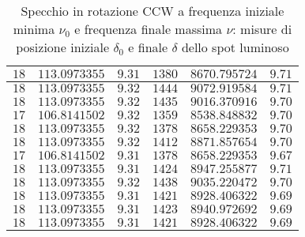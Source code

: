 \documentclass{article} %
\begin{document}
\begin{table}
\begin{tabular}{||c|c|c||c|c|c||}
            $18$ & $113.0973355$ & $9.31$ & $1380$ & $8670.795724$ & $9.71$ \\\hline
            $18$ & $113.0973355$ & $9.32$ & $1444$ & $9072.919584$ & $9.71$ \\\hline
            $18$ & $113.0973355$ & $9.32$ & $1435$ & $9016.370916$ & $9.70$ \\\hline
            $17$ & $106.8141502$ & $9.32$ & $1359$ & $8538.848832$ & $9.70$ \\\hline
            $18$ & $113.0973355$ & $9.32$ & $1378$ & $8658.229353$ & $9.70$ \\\hline
            $18$ & $113.0973355$ & $9.32$ & $1412$ & $8871.857654$ & $9.70$ \\\hline
            $17$ & $106.8141502$ & $9.31$ & $1378$ & $8658.229353$ & $9.67$ \\\hline
            $18$ & $113.0973355$ & $9.31$ & $1424$ & $8947.255877$ & $9.71$ \\\hline
            $18$ & $113.0973355$ & $9.32$ & $1438$ & $9035.220472$ & $9.70$ \\\hline
            $18$ & $113.0973355$ & $9.31$ & $1421$ & $8928.406322$ & $9.69$ \\\hline
            $18$ & $113.0973355$ & $9.31$ & $1423$ & $8940.972692$ & $9.69$ \\\hline
            $18$ & $113.0973355$ & $9.31$ & $1421$ & $8928.406322$ & $9.69$ \\\hline
        \end{tabular}
        \caption{Specchio in rotazione CCW a frequenza iniziale minima $\nu_0$ e frequenza finale massima $\nu$: misure di posizione iniziale $\delta_0$ e finale $\delta$ dello spot luminoso}
        \label{CCW_min_max}
    \end{table}
\end{document}
